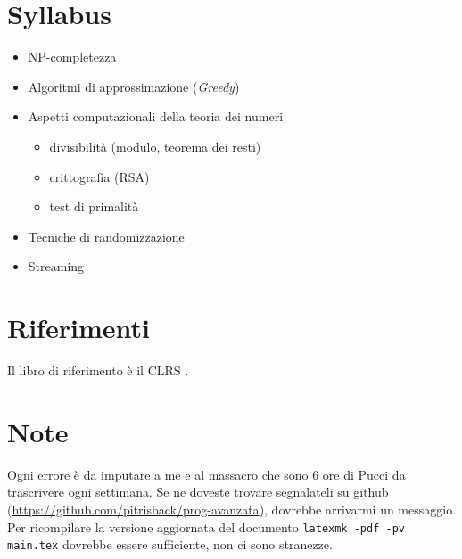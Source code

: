 

\section*{Syllabus}

\begin{itemize}
    \item NP-completezza
    \item Algoritmi di approssimazione (\textit{Greedy})
    \item Aspetti computazionali della teoria dei numeri
        \begin{itemize}
            \item divisibilità (modulo, teorema dei resti)
            \item crittografia (RSA)
            \item test di primalità
        \end{itemize}
    \item Tecniche di randomizzazione
    \item Streaming
\end{itemize}

\section*{Riferimenti}

Il libro di riferimento è il CLRS \cite{Cormen:2009:IAT:1614191}.

\section*{Note}

Ogni errore è da imputare a me e al massacro che sono 6 ore di Pucci da trascrivere ogni settimana. Se ne doveste trovare segnalateli su github (\url{https://github.com/pitrisback/prog-avanzata}), dovrebbe arrivarmi un messaggio. Per ricompilare la versione aggiornata del documento \texttt{latexmk -pdf -pv main.tex} dovrebbe essere sufficiente, non ci sono stranezze.
